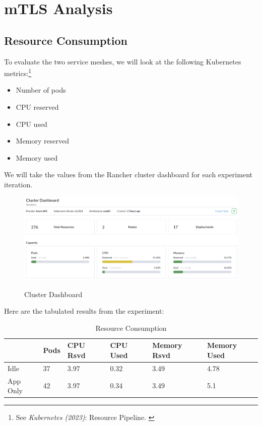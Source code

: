 %
%

\pagebreak
\section{mTLS Analysis}

\onehalfspacing

\subsection{Resource Consumption}

To evaluate the two service meshes, we will look at the following Kubernetes metrics:\footnote{See \textit{Kubernetes (2023)}: Resource Pipeline. \cite{resPipeline}}

\begin{itemize}
    \item Number of pods
    \item CPU reserved
    \item CPU used
    \item Memory reserved
    \item Memory used
\end{itemize}

We will take the values from the Rancher cluster dashboard for each experiment iteration.

\begin{figure}[H]
\centering
\caption {Cluster Dashboard}
\includegraphics[width=\linewidth]{images/cluster-dashboard.png}
\label{fig:clusterDashboard}
\end{figure}

Here are the tabulated results from the experiment:

\begin{table}[h]
  \centering
  \caption{Resource Consumption}
    \begin{tabular}{| l | l | l | l | l | l |}
    \hline
    & Pods & CPU Rsvd & CPU Used & Memory Rsvd & Memory Used \\
    \hline\hline
    Idle & 37 & 3.97 & 0.32 & 3.49 & 4.78 \\
    \hline
    App Only & 42 & 3.97 & 0.34 & 3.49 & 5.1 \\
    \hline
    \hline
    \end{tabular}
  \label{tab:resUsage}
\end{table}


